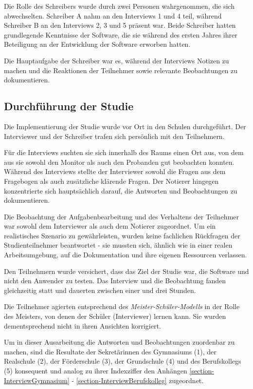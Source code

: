 Die Rolle des Schreibers wurde durch zwei Personen wahrgenommen, die sich abwechselten. Schreiber A nahm an den Interviews 1 und 4 teil, während Schreiber B an den Interviews 2, 3 und 5 präsent war. Beide Schreiber hatten grundlegende Kenntnisse der Software, die sie während des ersten Jahres ihrer Beteiligung an der Entwicklung der Software erworben hatten.

Die Hauptaufgabe der Schreiber war es, während der Interviews Notizen zu machen und die Reaktionen der Teilnehmer sowie relevante Beobachtungen zu dokumentieren. 

\subsection{Durchführung der Studie}

Die Implementierung der Studie wurde vor Ort in den Schulen durchgeführt. Der Interviewer und der Schreiber trafen sich persönlich mit den Teilnehmern.

Für die Interviews suchten sie sich innerhalb des Raums einen Ort aus, von dem aus sie sowohl den Monitor als auch den Probanden gut beobachten konnten. Während des Interviews stellte der Interviewer sowohl die Fragen aus dem Fragebogen als auch zusätzliche klärende Fragen. Der Notierer hingegen konzentrierte sich hauptsächlich darauf, die Antworten und Beobachtungen zu dokumentieren.

Die Beobachtung der Aufgabenbearbeitung und des Verhaltens der Teilnehmer war sowohl dem Interviewer als auch dem Notierer zugeordnet. Um ein realistisches Szenario zu gewährleisten, wurden keine fachlichen Rückfragen der Studienteilnehmer beantwortet - sie mussten sich, ähnlich wie in einer realen Arbeitsumgebung, auf die Dokumentation und ihre eigenen Ressourcen verlassen.

Den Teilnehmern wurde versichert, dass das Ziel der Studie war, die Software und nicht den Anwender zu testen. Das Interview und die Beobachtung fanden gleichzeitig statt und dauerten zwischen einer und drei Stunden.

Die Teilnehmer agierten entsprechend des \textit{Meister-Schüler-Modells} in der Rolle des Meisters, von denen der Schüler (Interviewer) lernen kann.\cite{Seibert-Giller,jacobsen} Sie wurden dementsprechend nicht in ihren Ansichten korrigiert.

Um in dieser Ausarbeitung die Antworten und Beobachtungen zuordenbar zu machen, sind die Resultate der Sekretärinnen des Gymnasiums (1), der Realschule (2), der Förderschule (3), der Grundschule (4) und des Berufskollegs (5) konsequent und analog zu ihrer Indexziffer den Anhängen \ref{section-InterviewGymnasium} - \ref{section-InterviewBerufskolleg} zugeordnet.


